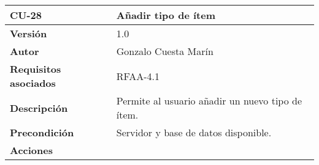 \begin{longtable}[]{@{}ll@{}}
\toprule
\begin{minipage}[b]{0.21\columnwidth}\raggedright
\textbf{CU-28}\strut
\end{minipage} & \begin{minipage}[b]{0.73\columnwidth}\raggedright
\textbf{Añadir tipo de ítem}\strut
\end{minipage}\tabularnewline
\midrule
\endhead
\begin{minipage}[t]{0.21\columnwidth}\raggedright
\textbf{Versión}\strut
\end{minipage} & \begin{minipage}[t]{0.73\columnwidth}\raggedright
1.0\strut
\end{minipage}\tabularnewline
\begin{minipage}[t]{0.21\columnwidth}\raggedright
\textbf{Autor}\strut
\end{minipage} & \begin{minipage}[t]{0.73\columnwidth}\raggedright
Gonzalo Cuesta Marín\strut
\end{minipage}\tabularnewline
\begin{minipage}[t]{0.21\columnwidth}\raggedright
\textbf{Requisitos asociados}\strut
\end{minipage} & \begin{minipage}[t]{0.73\columnwidth}\raggedright
RFAA-4.1\strut
\end{minipage}\tabularnewline
\begin{minipage}[t]{0.21\columnwidth}\raggedright
\textbf{Descripción}\strut
\end{minipage} & \begin{minipage}[t]{0.73\columnwidth}\raggedright
Permite al usuario añadir un nuevo tipo de ítem.\strut
\end{minipage}\tabularnewline
\begin{minipage}[t]{0.21\columnwidth}\raggedright
\textbf{Precondición}\strut
\end{minipage} & \begin{minipage}[t]{0.73\columnwidth}\raggedright
Servidor y base de datos disponible.\strut
\end{minipage}\tabularnewline
\begin{minipage}[t]{0.21\columnwidth}\raggedright
\textbf{Acciones}\strut
\end{minipage} & \begin{minipage}[t]{0.73\columnwidth}\raggedright
\begin{enumerate}
\def\labelenumi{\arabic{enumi}.}

\end{enumerate}
\end{minipage}
\end{longtable}
